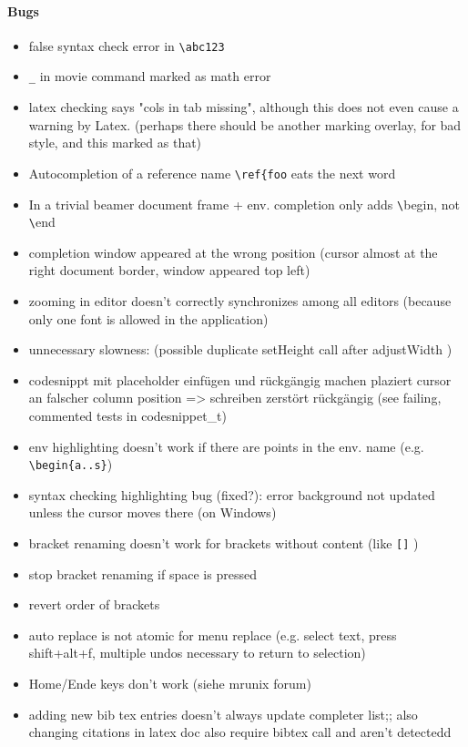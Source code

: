 \documentclass[10pt,a4paper,portrait]{article}
\begin{document}
\paragraph{Bugs}
\begin{itemize}
\item false syntax check error in \verb+\abc123+
\item \verb+_+ in movie command marked as math error
\item latex checking says "cols in tab missing", although this does not even cause a warning by Latex. (perhaps there should be another marking overlay, for bad style, and this marked as that)
\item Autocompletion of a reference name \verb+\ref{foo+ eats the next word
\item In a trivial beamer document frame + env. completion only adds \verb+\+begin, not \verb+\+end
\item completion window appeared at the wrong position (cursor almost at the right document border, window appeared top left)
\item zooming in editor doesn't correctly synchronizes among all editors (because only one font is allowed in the application)
\item unnecessary slowness: (possible duplicate setHeight call after adjustWidth )
\item codesnippt mit placeholder einfügen und rückgängig machen plaziert cursor an falscher column position => schreiben zerstört rückgängig (see failing, commented tests in codesnippet\_t)
\item  env highlighting doesn't work if there are points in the env. name (e.g. \verb+\begin{a..s}+)
\item syntax checking highlighting bug (fixed?): error background not updated unless the cursor moves there (on Windows)
\item bracket renaming doesn't work for brackets without content (like \verb+[]+ )
\item stop bracket renaming if space is pressed
\item revert order of brackets
\item auto replace is not atomic for menu replace (e.g. select text, press shift+alt+f, multiple undos necessary to return to selection)
\item Home/Ende keys don't work (siehe mrunix forum)
\item adding new bib tex entries doesn't always update completer list;; also changing citations in latex doc also require bibtex call and aren't detectedd

\end{itemize}
\end{document}
